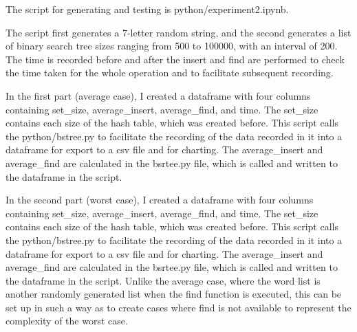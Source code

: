 \documentclass[a4]{article}
\begin{document}
The script for generating and testing is python/experiment2.ipynb.

The script first generates a 7-letter random string, and the second generates a list of binary search tree sizes ranging from 500 to 100000, with an interval of 200. The time is recorded before and after the insert and find are performed to check the time taken for the whole operation and to facilitate subsequent recording.

In the first part (average case), I created a dataframe with four columns containing set\_size, average\_insert, average\_find, and time. The set\_size contains each size of the hash table, which was created before. This script calls the python/bstree.py to facilitate the recording of the data recorded in it into a dataframe for export to a csv file and for charting. The average\_insert and average\_find are calculated in the bsrtee.py file, which is called and written to the dataframe in the script.

In the second part (worst case), I created a dataframe with four columns containing set\_size, average\_insert, average\_find, and time. The set\_size contains each size of the hash table, which was created before. This script calls the python/bstree.py to facilitate the recording of the data recorded in it into a dataframe for export to a csv file and for charting. The average\_insert and average\_find are calculated in the bsrtee.py file, which is called and written to the dataframe in the script. Unlike the average case, where the word list is another randomly generated list when the find function is executed, this can be set up in such a way as to create cases where find is not available to represent the complexity of the worst case.
\end{document}
